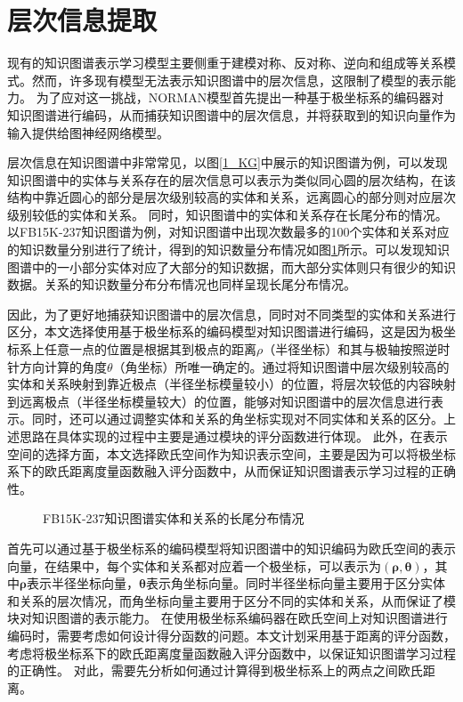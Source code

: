 \documentclass[algorithmlist, AutoFakeBold, AutoFakeSlant, figurelist, tablelist, nomlist, engineering, openany]{seuthesix} %
\begin{document}
\section{层次信息提取}
现有的知识图谱表示学习模型主要侧重于建模对称、反对称、逆向和组成等关系模式。然而，许多现有模型无法表示知识图谱中的层次信息，这限制了模型的表示能力。
为了应对这一挑战，NORMAN模型首先提出一种基于极坐标系的编码器对知识图谱进行编码，从而捕获知识图谱中的层次信息，并将获取到的知识向量作为输入提供给图神经网络模型。

层次信息在知识图谱中非常常见，以图\ref{1_KG}中展示的知识图谱为例，可以发现知识图谱中的实体与关系存在的层次信息可以表示为类似同心圆的层次结构，在该结构中靠近圆心的部分是层次级别较高的实体和关系，远离圆心的部分则对应层次级别较低的实体和关系。
同时，知识图谱中的实体和关系存在长尾分布的情况。以FB15K-237知识图谱为例，对知识图谱中出现次数最多的100个实体和关系对应的知识数量分别进行了统计，得到的知识数量分布情况如图\ref{2_LongTail}所示。可以发现知识图谱中的一小部分实体对应了大部分的知识数据，而大部分实体则只有很少的知识数据。关系的知识数量分布分布情况也同样呈现长尾分布情况。

因此，为了更好地捕获知识图谱中的层次信息，同时对不同类型的实体和关系进行区分，本文选择使用基于极坐标系的编码模型对知识图谱进行编码，这是因为极坐标系上任意一点的位置是根据其到极点的距离$\rho$（半径坐标）和其与极轴按照逆时针方向计算的角度$\theta$（角坐标）所唯一确定的。通过将知识图谱中层次级别较高的实体和关系映射到靠近极点（半径坐标模量较小）的位置，将层次较低的内容映射到远离极点（半径坐标模量较大）的位置，能够对知识图谱中的层次信息进行表示。同时，还可以通过调整实体和关系的角坐标实现对不同实体和关系的区分。上述思路在具体实现的过程中主要是通过模块的评分函数进行体现。
此外，在表示空间的选择方面，本文选择欧氏空间作为知识表示空间，主要是因为可以将极坐标系下的欧氏距离度量函数融入评分函数中，从而保证知识图谱表示学习过程的正确性。
\begin{figure}
  \centering
  \caption{FB15K-237知识图谱实体和关系的长尾分布情况}
  \label{2_LongTail}
\end{figure}

首先可以通过基于极坐标系的编码模型将知识图谱中的知识编码为欧氏空间的表示向量，在结果中，每个实体和关系都对应着一个极坐标，可以表示为$(\bm{\rho}, \bm{\theta})$，其中$\bm{\rho}$表示半径坐标向量，$\bm{\theta}$表示角坐标向量。同时半径坐标向量主要用于区分实体和关系的层次情况，而角坐标向量主要用于区分不同的实体和关系，从而保证了模块对知识图谱的表示能力。
在使用极坐标系编码器在欧氏空间上对知识图谱进行编码时，需要考虑如何设计得分函数的问题。本文计划采用基于距离的评分函数，考虑将极坐标系下的欧氏距离度量函数融入评分函数中，以保证知识图谱学习过程的正确性。
对此，需要先分析如何通过计算得到极坐标系上的两点之间欧氏距离。
\end{document}
